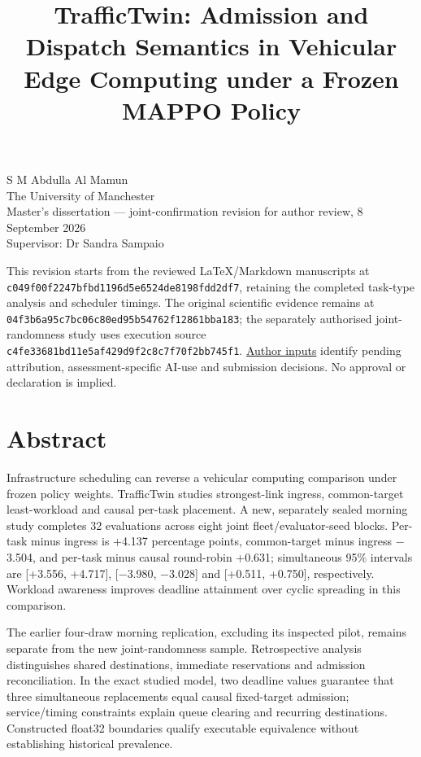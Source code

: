 \documentclass[11pt,a4paper]{article}
\title{TrafficTwin: Admission and Dispatch Semantics in Vehicular Edge Computing under a Frozen MAPPO Policy}
\author{}
\date{}
\begin{document}
\maketitle
S M Abdulla Al Mamun\\
The University of Manchester\\
Master's dissertation --- joint-confirmation revision for author review, 8 September 2026\\
Supervisor: Dr Sandra Sampaio

This revision starts from the reviewed LaTeX/Markdown manuscripts at \texttt{c049f00f2247bfbd1196d5e6524de8198fdd2df7}, retaining the completed task-type analysis and scheduler timings. The original scientific evidence remains at \texttt{04f3b6a95c7bc06c80ed95b54762f12861bba183}; the separately authorised joint-randomness study uses execution source \texttt{c4fe33681bd11e5af429d9f2c8c7f70f2bb745f1}. \href{\detokenize{AUTHOR_INPUTS.md}}{Author inputs} identify pending attribution, assessment-specific AI-use and submission decisions. No approval or declaration is implied.

\section*{Abstract}\label{sec:abstract}

Infrastructure scheduling can reverse a vehicular computing comparison under frozen policy weights. TrafficTwin studies strongest-link ingress, common-target least-workload and causal per-task placement. A new, separately sealed morning study completes 32 evaluations across eight joint fleet/evaluator-seed blocks. Per-task minus ingress is +4.137 percentage points, common-target minus ingress \ensuremath{-}3.504, and per-task minus causal round-robin +0.631; simultaneous 95\% intervals are [+3.556, +4.717], [\ensuremath{-}3.980, \ensuremath{-}3.028] and [+0.511, +0.750], respectively. Workload awareness improves deadline attainment over cyclic spreading in this comparison.

The earlier four-draw morning replication, excluding its inspected pilot, remains separate from the new joint-randomness sample. Retrospective analysis distinguishes shared destinations, immediate reservations and admission reconciliation. In the exact studied model, two deadline values guarantee that three simultaneous replacements equal causal fixed-target admission; service/timing constraints explain queue clearing and recurring destinations. Constructed float32 boundaries qualify executable equivalence without establishing historical prevalence.
\end{document}
